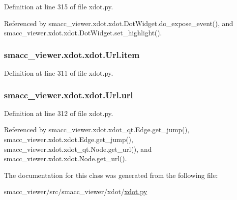 Definition at line 315 of file xdot.\+py.



Referenced by smacc\+\_\+viewer.\+xdot.\+xdot.\+Dot\+Widget.\+do\+\_\+expose\+\_\+event(), and smacc\+\_\+viewer.\+xdot.\+xdot.\+Dot\+Widget.\+set\+\_\+highlight().

\subsubsection[{\texorpdfstring{item}{item}}]{\setlength{\rightskip}{0pt plus 5cm}smacc\+\_\+viewer.\+xdot.\+xdot.\+Url.\+item}\hypertarget{classsmacc__viewer_1_1xdot_1_1xdot_1_1Url_ad6da3cce0f6c7413f002204ab2a4a836}{}\label{classsmacc__viewer_1_1xdot_1_1xdot_1_1Url_ad6da3cce0f6c7413f002204ab2a4a836}


Definition at line 311 of file xdot.\+py.

\subsubsection[{\texorpdfstring{url}{url}}]{\setlength{\rightskip}{0pt plus 5cm}smacc\+\_\+viewer.\+xdot.\+xdot.\+Url.\+url}\hypertarget{classsmacc__viewer_1_1xdot_1_1xdot_1_1Url_a46f83d8fd310c90f35269c7e5760bdbc}{}\label{classsmacc__viewer_1_1xdot_1_1xdot_1_1Url_a46f83d8fd310c90f35269c7e5760bdbc}


Definition at line 312 of file xdot.\+py.



Referenced by smacc\+\_\+viewer.\+xdot.\+xdot\+\_\+qt.\+Edge.\+get\+\_\+jump(), smacc\+\_\+viewer.\+xdot.\+xdot.\+Edge.\+get\+\_\+jump(), smacc\+\_\+viewer.\+xdot.\+xdot\+\_\+qt.\+Node.\+get\+\_\+url(), and smacc\+\_\+viewer.\+xdot.\+xdot.\+Node.\+get\+\_\+url().



The documentation for this class was generated from the following file\+:\begin{DoxyCompactItemize}
\item 
smacc\+\_\+viewer/src/smacc\+\_\+viewer/xdot/\hyperlink{xdot_8py}{xdot.\+py}\end{DoxyCompactItemize}
